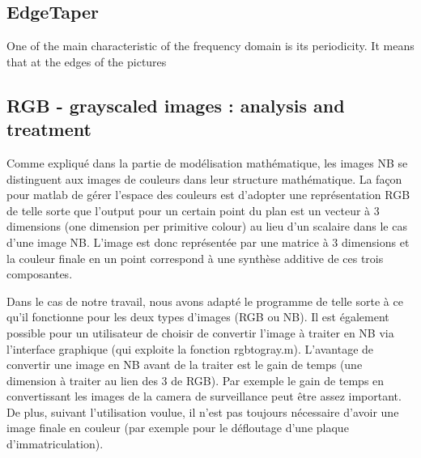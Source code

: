 \subsection{EdgeTaper}

One of the main characteristic of the frequency domain is its periodicity. It means that at the edges of the pictures  

\subsection{RGB - grayscaled images : analysis and treatment}

Comme expliqué dans la partie de modélisation mathématique, les images NB se distinguent aux images de couleurs dans leur structure mathématique. La façon pour matlab de gérer l'espace des couleurs est d'adopter une représentation RGB de telle sorte que l'output pour un certain point du plan est un vecteur à 3 dimensions (one dimension per primitive colour) au lieu d'un scalaire dans le cas d'une image NB. L'image est donc représentée par une matrice à 3 dimensions et la couleur finale en un point correspond à une synthèse additive de ces trois composantes.

Dans le cas de notre travail, nous avons adapté le programme de telle sorte à ce qu'il fonctionne pour les deux types d'images (RGB ou NB). Il est également possible pour un utilisateur de choisir de convertir l'image à traiter en NB via l'interface graphique (qui exploite la fonction rgbtogray.m). L'avantage de convertir une image en NB avant de la traiter est le gain de temps (une dimension à traiter au lien des 3 de RGB). Par exemple le gain de temps en convertissant les images de la camera de surveillance peut être assez important. De plus, suivant l'utilisation voulue, il n'est pas toujours nécessaire d'avoir une image finale en couleur (par exemple pour le défloutage d'une plaque d'immatriculation). 